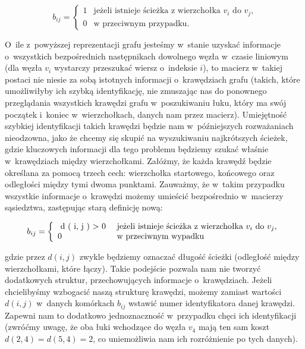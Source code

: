 \begin{equation}
	b_{ij}= \left\{ 
	\begin{array}{ll}
	1 & \textrm{jeżeli istnieje ścieżka z~wierzchołka $v_{i}$ do $v_{j}$,}\\
	0 & \textrm{w przeciwnym przypadku.}
	\end{array} \right.
\end{equation}


O~ile z~powyższej reprezentacji grafu jesteśmy w~stanie uzyskać informacje o~wszystkich bezpośrednich następnikach dowolnego węzła w~czasie liniowym (dla węzła $v_{i}$ wystarczy przeszukać wiersz o~indeksie $i$), to macierz w~takiej postaci nie niesie za sobą istotnych informacji o~krawędziach grafu (takich, które umożliwiłyby ich szybką identyfikację, nie zmuszając nas do ponownego przeglądania wszystkich krawędzi grafu w~poszukiwaniu łuku, który ma swój początek i~koniec w~wierzchołkach, danych nam przez macierz). Umiejętność szybkiej identyfikacji takich krawędzi będzie nam w~późniejszych rozważaniach nieodzowna, jako że chcemy się skupić na wyszukiwaniu najkrótszych ścieżek, gdzie kluczowych informacji dla tego problemu będziemy szukać właśnie w~krawędziach między wierzchołkami. Załóżmy, że każda krawędź będzie określana za pomocą trzech cech: wierzchołka startowego, końcowego oraz odległości między tymi dwoma punktami. Zauważmy, że w~takim przypadku wszystkie informacje o~krawędzi możemy umieścić bezpośrednio w~macierzy sąsiedztwa, zastępując starą definicję nową: 

\begin{savenotes}
	\begin{equation}
		b_{ij}= \left\{ 
		\begin{array}{ll}
		$ d ( i, j ) > 0 $ & \textrm{jeżeli istnieje ścieżka z wierzchołka $v_{i}$ do $v_{j}$,}\\
		0 & \textrm{w przeciwnym wypadku}
		\end{array} \right.
	\end{equation}
\end{savenotes}

gdzie przez $ d \left( i,j \right) $ zwykle będziemy oznaczać długość ścieżki (odległość między wierzchołkami, które łączy). Takie podejście pozwala nam nie tworzyć dodatkowych struktur, przechowujących informacje o~krawędziach. Jeżeli chcielibyśmy wzbogacić naszą strukturę krawędzi, możemy zamiast wartości $d \left( i,j \right)$ w~danych komórkach $b_{ij}$ wstawić numer identyfikatora danej krawędzi. Zapewni nam to dodatkowo jednoznaczność w~przypadku chęci ich identyfikacji (zwróćmy uwagę, że oba łuki wchodzące do węzła $v_{4}$ mają ten sam koszt $ d \left( 2, 4 \right) = d \left( 5, 4 \right) = 2$, co uniemożliwia nam ich rozróżnienie po tych danych).

